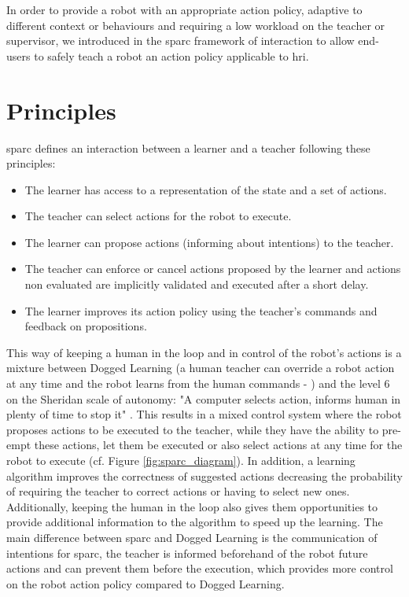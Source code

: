 In order to provide a robot with an appropriate action policy, adaptive to different context or behaviours and requiring a low workload on the teacher or supervisor, we introduced in \cite{senft2015sparc} the \acrfull{sparc} framework of interaction to allow end-users to safely teach a robot an action policy applicable to \gls{hri}.

\section{Principles} \label{sec:sparc_principles}

\gls{sparc} defines an interaction between a learner and a teacher following these principles:
\begin{itemize}
	\item The learner has access to a representation of the state and a set of actions.
	\item The teacher can select actions for the robot to execute.
	\item The learner can propose actions (informing about intentions) to the teacher.
	\item The teacher can enforce or cancel actions proposed by the learner and actions non evaluated are implicitly validated and executed after a short delay.
	\item The learner improves its action policy using the teacher's commands and feedback on propositions.
\end{itemize} 

This way of keeping a human in the loop and in control of the robot's actions is a mixture between Dogged Learning (a human teacher can override a  robot action at any time and the robot learns from the human commands - \citealt{grollman2007dogged}) and the level 6 on the Sheridan scale of autonomy: "A computer selects action, informs human in plenty of time to stop it" \citep{sheridan1978human}. This results in a mixed control system where the robot proposes actions to be executed to the teacher, while they have the ability to pre-empt these actions, let them be executed or also select actions at any time for the robot to execute (cf. Figure \ref{fig:sparc_diagram}). In addition, a learning algorithm improves the correctness of suggested actions decreasing the probability of requiring the teacher to correct actions or having to select new ones. Additionally, keeping the human in the loop also gives them opportunities to provide additional information to the algorithm to speed up the learning. The main difference between \gls{sparc} and Dogged Learning is the communication of intentions for \gls{sparc}, the teacher is informed beforehand of the robot future actions and can prevent them before the execution, which provides more control on the robot action policy compared to Dogged Learning.

